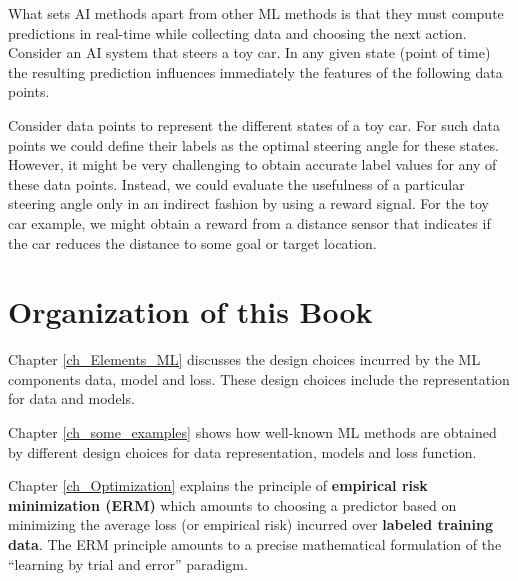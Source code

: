 \documentclass[12pt]{report}
\begin{document}
What sets AI methods apart from other ML methods is that they must 
compute predictions in real-time while collecting data and choosing 
the next action. Consider an AI system that steers a toy car. In any 
given state (point of time) the resulting prediction influences immediately 
the features of the following data points. 

Consider data points to represent the different states of a toy car. 
For such data points we  could define their labels as the optimal 
steering angle for these states. However, it might be very challenging 
to obtain accurate label values for any of these data points. Instead, 
we could evaluate the usefulness of a particular steering angle only 
in an indirect fashion by using a reward signal. For the toy car example, 
we might obtain a reward from a distance sensor that indicates if the 
car reduces the distance to some goal or target location. 




\section{Organization of this Book}

Chapter \ref{ch_Elements_ML} discusses the design choices incurred 
by the ML components data, model and loss. These design choices 
include the representation for data and  models. %

Chapter \ref{ch_some_examples} shows how well-known ML methods 
are obtained by different design choices for data representation, models 
and loss function. 



Chapter \ref{ch_Optimization} explains the principle of {\bf empirical risk minimization (ERM)} 
which amounts to choosing  a predictor based on minimizing the average loss (or empirical risk) 
incurred over {\bf labeled training data}. The ERM principle amounts to a precise mathematical 
formulation of the ``learning by trial and error'' paradigm. 
\end{document}
